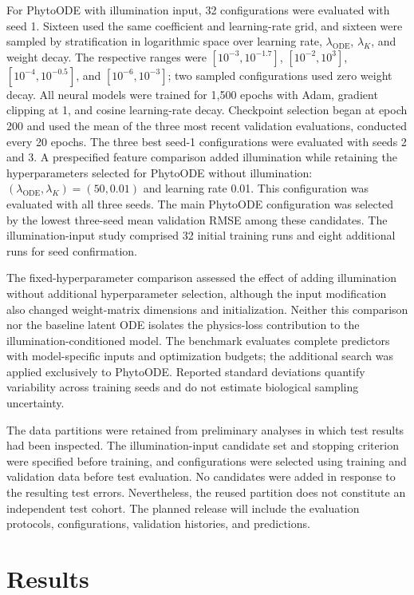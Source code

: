 \documentclass[preprint,12pt,authoryear]{elsarticle}
\begin{document}
For PhytoODE with illumination input, 32 configurations were evaluated with seed 1. Sixteen used the same coefficient and learning-rate grid, and sixteen were sampled by stratification in logarithmic space over learning rate, $\lambda_{\mathrm{ODE}}$, $\lambda_K$, and weight decay. The respective ranges were $[10^{-3},10^{-1.7}]$, $[10^{-2},10^3]$, $[10^{-4},10^{-0.5}]$, and $[10^{-6},10^{-3}]$; two sampled configurations used zero weight decay. All neural models were trained for 1,500 epochs with Adam, gradient clipping at 1, and cosine learning-rate decay. Checkpoint selection began at epoch 200 and used the mean of the three most recent validation evaluations, conducted every 20 epochs. The three best seed-1 configurations were evaluated with seeds 2 and 3. A prespecified feature comparison added illumination while retaining the hyperparameters selected for PhytoODE without illumination: $(\lambda_{\mathrm{ODE}},\lambda_K)=(50,0.01)$ and learning rate 0.01. This configuration was evaluated with all three seeds. The main PhytoODE configuration was selected by the lowest three-seed mean validation RMSE among these candidates. The illumination-input study comprised 32 initial training runs and eight additional runs for seed confirmation.

The fixed-hyperparameter comparison assessed the effect of adding illumination without additional hyperparameter selection, although the input modification also changed weight-matrix dimensions and initialization. Neither this comparison nor the baseline latent ODE isolates the physics-loss contribution to the illumination-conditioned model. The benchmark evaluates complete predictors with model-specific inputs and optimization budgets; the additional search was applied exclusively to PhytoODE. Reported standard deviations quantify variability across training seeds and do not estimate biological sampling uncertainty.

The data partitions were retained from preliminary analyses in which test results had been inspected. The illumination-input candidate set and stopping criterion were specified before training, and configurations were selected using training and validation data before test evaluation. No candidates were added in response to the resulting test errors. Nevertheless, the reused partition does not constitute an independent test cohort. The planned release will include the evaluation protocols, configurations, validation histories, and predictions.


\section{Results}
\label{sec:results}
\end{document}

